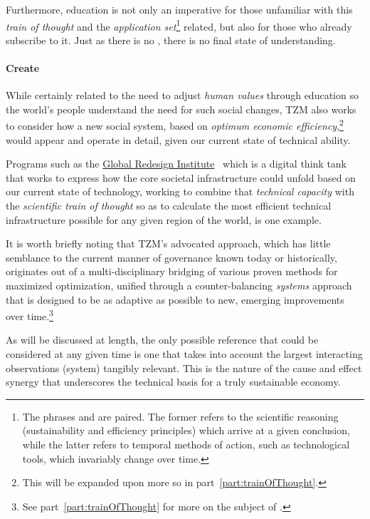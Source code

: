 \documentclass[10pt, a4paper, cleardoubleempty, openright, twoside]{book}
\begin{document}
Furthermore, education is not only an imperative for those unfamiliar
with this \emph{train of thought} and the \emph{application set}\footnote{
	The phrases  and  are paired. The former refers to the scientific reasoning
	(sustainability and efficiency principles) which arrive at a given
	conclusion, while the latter refers to temporal methods of action,
	such as technological tools, which invariably change over time.
}
related, but also for those who already subscribe to it. Just as there
is no , there is no final state of understanding.

\paragraph {Create}

While certainly related to the need to adjust \emph{human values} through
education so the world's people understand the need for such social
changes, TZM also works to consider how a new social system, based on
\emph{optimum economic efficiency},\footnote{
	This will be expanded upon more so in part~\ref{part:trainOfThought}.
}	
would appear and operate in detail, given our current state of technical
ability.

Programs such as the
\href{http://www.globalredesigninstitute.org}{Global Redesign
Institute}~\cite{GRI:http:14} which is a digital think tank that works
to express how the core societal infrastructure could unfold based on
our current state of technology, working to combine that \emph{technical
capacity} with the \emph{scientific train of thought} so as to calculate
the most efficient technical infrastructure possible for any given
region of the world, is one example. 

It is worth briefly noting that TZM's advocated 
approach, which has little semblance to the current manner of governance
known today or historically, originates out of a multi-disciplinary
bridging of various proven methods for maximized optimization, unified
through a counter-balancing \emph{systems} approach that is designed to
be as adaptive as possible to new, emerging improvements over
time.\footnote{
	See part~\ref{part:trainOfThought} for more on the subject of
	.
}

As will be discussed at length, the only possible reference that could
be considered  at any given time is one that
takes into account the largest interacting observations (system)
tangibly relevant.  This is the nature of the cause and effect synergy
that underscores the technical basis for a truly sustainable economy.
\end{document}
